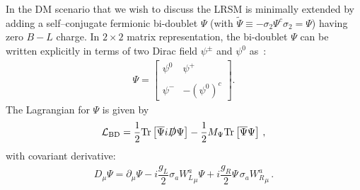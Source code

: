 \documentclass[11pt]{article}
\begin{document}
In the DM scenario that we wish to discuss the LRSM is minimally extended by adding a self--conjugate fermionic bi-doublet $\Psi$ 
(with $\tilde{\Psi}\equiv -\sigma_2 \Psi^c \sigma_2 = \Psi$) having zero $B-L$ charge. 
In $2\times2$ matrix representation, the bi-doublet $\Psi$ can be
written explicitly in terms of two Dirac field $\psi^\pm$ and $\psi^0$ as~\cite{Garcia-Cely_LR_pheno}:
\begin{eqnarray}
\Psi = 
\begin{bmatrix}
\psi^0 & \psi^+ \\
\\
\psi^{-} & -\left(\psi^0\right)^c
\end{bmatrix}
\label{eq:dirac_bidoublet}.
\end{eqnarray}
\noindent The Lagrangian
for $\Psi$ is given by
\begin{eqnarray}
\mathcal{L}_{\rm BD} = \dfrac{1}{2} 
{\rm Tr}\left[\overline{\Psi}i\slashed{D}\Psi\right]-
\dfrac{1}{2}M_{\Psi} {\rm Tr}\left[\overline{\Psi}\Psi\right]\,,
\label{eq:Lagrangian_BD}
\end{eqnarray}
with covariant derivative:
\begin{eqnarray}
D_{\mu} \Psi = \partial_{\mu} \Psi - i\dfrac{g_L}{2}
\sigma_{a}{W_{L}^{a}}_{\mu} \Psi + i\dfrac{g_R}{2}
\Psi\,\sigma_{a}{W_R^{a}}_{\mu}\,.
\end{eqnarray}
\end{document}
